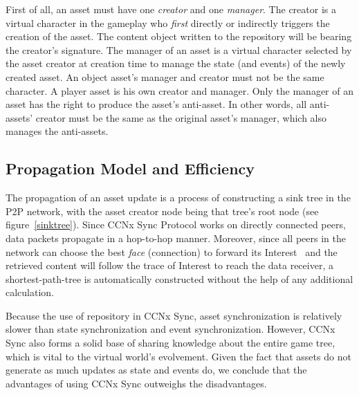 First of all, an asset must have one \emph{creator} and one \emph{manager}. The creator is a virtual character in the gameplay who \emph{first} directly or indirectly triggers the creation of the asset. The content object written to the repository will be bearing the creator's signature. The manager of an asset is a virtual character selected by the asset creator at creation time to manage the state (and events) of the newly created asset. An object asset's manager and creator must not be the same character. A player asset is his own creator and manager. Only the manager of an asset has the right to produce the asset's anti-asset. In other words, all anti-assets' creator must be the same as the original asset's manager, which also manages the anti-assets.




\subsection{Propagation Model and Efficiency}

The propagation of an asset update is a process of constructing a sink tree in the P2P network, with the asset creator node being that tree's root node (see figure~\ref{sinktree}). Since CCNx Sync Protocol works on directly connected peers, data packets propagate in a hop-to-hop manner. Moreover, since all peers in the network can choose the best \emph{face} (connection) to forward its Interest~\cite{Jndn} and the retrieved content will follow the trace of Interest to reach the data receiver, a shortest-path-tree is automatically constructed without the help of any additional calculation.

Because the use of repository in CCNx Sync, asset synchronization is relatively slower than state synchronization and event synchronization. However, CCNx Sync also forms a solid base of sharing knowledge about the entire game tree, which is vital to the virtual world's evolvement. Given the fact that assets do not generate as much updates as state and events do, we conclude that the advantages of using CCNx Sync outweighs the disadvantages.

